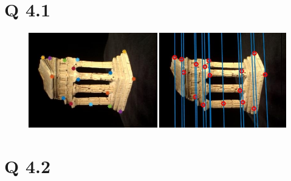 \documentclass[11pt]{article}
\begin{document}
\section*{Q 4.1}
\begin{figure}[H]
    \centering
    \includegraphics[width=\textwidth]{q4_1.jpg}
\end{figure}
\section*{Q 4.2}
\end{document}
